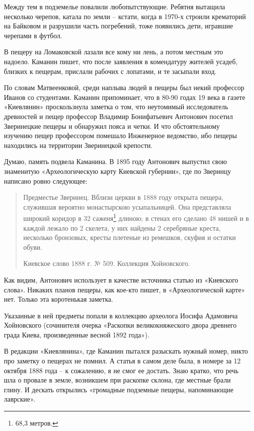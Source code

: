 Между тем в подземелье повалили любопытствующие. Ребятня вытащила несколько черепов, катала по земли – кстати, когда в 1970-х строили крематорий на Байковом и разрушили часть погребений, тоже появились дети, игравшие черепами в футбол.

В пещеру на Ломаковской лазали все кому ни лень, а потом местным это надоело. Каманин пишет, что после заявления в комендатуру жителей усадеб, близких к пещерам, прислали рабочих с лопатами, и те засыпали вход.

По словам Матвеенковой, среди наплыва людей в пещеры был некий профессор Иванов со студентами. Каманин припоминает, что в 80-90 годах 19 века в газете «Киевлянин» проскользнула заметка о том, что неутомимый исследователь древностей и пещер профессор Владимир Бонифатьевич Антонович посетил Зверинецкие пещеры и обнаружил пояса и четки. И что обстоятельному изучению пещер профессором помешало Инженерное ведомство, ибо пещеры находились на территории Зверинецкой крепости. 

Думаю, память подвела Каманина. В 1895 году Антонович выпустил свою знаменитую «Археологическую карту Киевской губернии»\cite{antonovich01}, где по Зверинцу написано ровно следующее:

\begin{quotation}
Предместье Зверинец. Вблизи церкви в 1888 году открыта пещера, служившая вероятно монастырскою усыпальницей. Она представляла широкий коридор в 32 саженя\footnote{68,3 метров.} длиною; в стенах его сделано 48 нишей и в каждой лежало по 2 скелета, у них найдены 2 серебряные креста, несколько бронзовых, кресты плетеные из ремешков, скуфия и остатки обуви.

Киевское слово 1888 г. № 509. Коллекция Хойновского.
\end{quotation}

Как видим, Антонович использует в качестве источника статью из «Киевского слова». Никаких планов пещеры, как кое-кто пишет, в «Археологической карте» нет. Только эта коротенькая заметка.


Указанные в ней предметы попали в коллекцию археолога Иосифа Адамовича Хойновского (сочинителя очерка «Раскопки великокняжеского двора древнего града Киева, произведенные весной 1892 года»).

В редакции «Киевлянина», где Каманин пытался разы\-скать нужный номер, никто про заметку о пещерах не помнил. А статья в самом деле была, в номере за 12 октября 1888 года – к сожалению, я не смог ее достать. Знаю кратко, что речь шла о провале в земле, возникшем при раскопке склона, где местные брали глину. И дескать открылись «громадные подземные пещеры, напоминающие лаврские».

